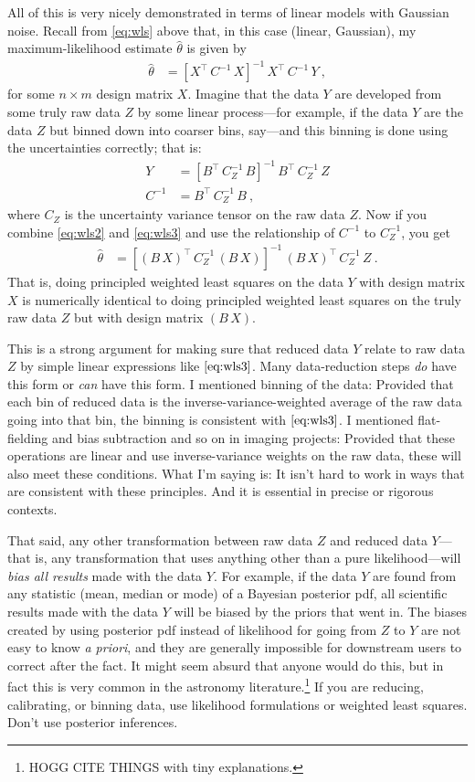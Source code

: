 \documentclass{article}
\newcommand{\foreign}[1]{\textsl{#1}}
\begin{document}
All of this is very nicely demonstrated in terms of linear models with Gaussian noise.
Recall from \eqref{eq:wls} above that, in this case (linear, Gaussian), my maximum-likelihood estimate $\hat\theta$ is given by
\begin{align}
    \hat\theta &= [X^\top\,C^{-1}\,X]^{-1}\,X^\top\,C^{-1}\,Y ~,\label{eq:wls2}
\end{align}
for some $n\times m$ design matrix $X$.
Imagine that the data $Y$ are developed from some truly raw data $Z$ by some linear process---for example, if the data $Y$ are the data $Z$ but binned down into coarser bins, say---and this binning is done using the uncertainties correctly; that is:
\begin{align}
    Y &= [B^\top\,C_Z^{-1}\,B]^{-1}\,B^\top\,C_Z^{-1}\,Z \label{eq:wls3} \\
    C^{-1} &= B^\top\,C_Z^{-1}\,B ~,
\end{align}
where $C_Z$ is the uncertainty variance tensor on the raw data $Z$.
Now if you combine \eqref{eq:wls2} and \eqref{eq:wls3} and use the relationship of $C^{-1}$ to $C_Z^{-1}$, you get
\begin{align}
    \hat\theta &= [(B\,X)^\top\,C_Z^{-1}\,(B\,X)]^{-1}\,(B\,X)^\top\,C_Z^{-1}\,Z ~.\label{eq:wls4}
\end{align}
That is, doing principled weighted least squares on the data $Y$ with design matrix $X$ is numerically identical to doing principled weighted least squares on the truly raw data $Z$ but with design matrix $(B\,X)$.

This is a strong argument for making sure that reduced data $Y$ relate to raw data $Z$ by simple linear expressions like $\eqref{eq:wls3}$.
Many data-reduction steps \emph{do} have this form or \emph{can} have this form.
I mentioned binning of the data: Provided that each bin of reduced data is the inverse-variance-weighted average of the raw data going into that bin, the binning is consistent with $\eqref{eq:wls3}$.
I mentioned flat-fielding and bias subtraction and so on in imaging projects:
Provided that these operations are linear and use inverse-variance weights on the raw data, these will also meet these conditions.
What I'm saying is: It isn't hard to work in ways that are consistent with these principles.
And it is essential in precise or rigorous contexts.

That said, any other transformation between raw data $Z$ and reduced data $Y$---that is, any transformation that uses anything other than a pure likelihood---will \emph{bias all results} made with the data $Y$.
For example, if the data $Y$ are found from any statistic (mean, median or mode) of a Bayesian posterior pdf, all scientific results made with the data $Y$ will be biased by the priors that went in.
The biases created by using posterior pdf instead of likelihood for going from $Z$ to $Y$ are not easy to know \foreign{a priori}, and they are generally impossible for downstream users to correct after the fact.
It might seem absurd that anyone would do this, but in fact this is very common in the astronomy literature.\footnote{HOGG CITE THINGS with tiny explanations.}
If you are reducing, calibrating, or binning data, use likelihood formulations or weighted least squares.
Don't use posterior inferences.
\end{document}
